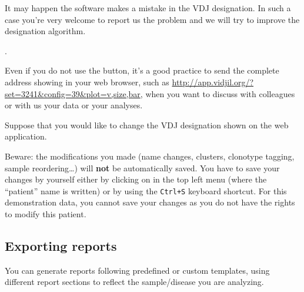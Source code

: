 \begin{verbatim}
\end{verbatim}


\bigskip

It may happen the software makes a mistake in the VDJ designation.
In such a case you're very welcome to report us the problem
and we will try to improve the designation algorithm.

.

Even if you do not use the  button, it's a good practice
to send the complete address showing in your web browser, such
as  \url{http://app.vidjil.org/?set=3241&config=39&plot=v,size,bar},
when you want to discuss with colleagues or with us your data or your analyses.

\bigskip

Suppose that you would like to change the VDJ designation shown on the web application.

Beware: the modifications you made (name changes, clusters, clonotype
tagging, sample reordering\dots) will \textbf{not} be automatically saved. You have to save
your changes by yourself either by clicking on  in the top left menu (where the
``patient'' name is written) or by using the \texttt{Ctrl+S} keyboard
shortcut.
For this demonstration data, you cannot save your changes as you do not have
the rights to modify this patient.

\subsection{Exporting reports}

You can generate reports following predefined or custom templates, using different report sections
to reflect the sample/disease you are analyzing.

